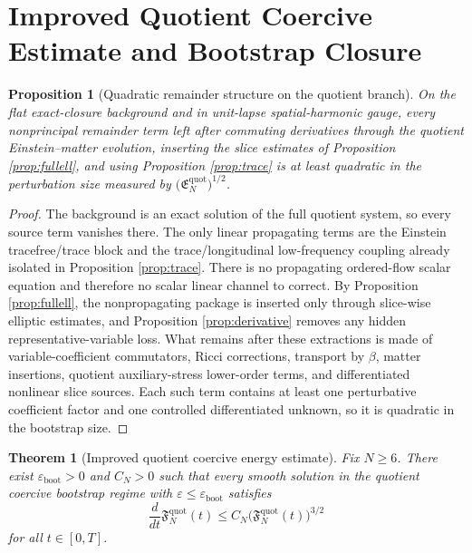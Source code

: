 \documentclass[11pt]{article}
\newtheorem{proposition}{Proposition}
\newtheorem{theorem}{Theorem}
\begin{document}
\section{Improved Quotient Coercive Estimate and Bootstrap Closure}

\begin{proposition}[Quadratic remainder structure on the quotient branch]
\label{prop:quadratic}
On the flat exact-closure background and in unit-lapse spatial-harmonic gauge, every nonprincipal remainder term left after commuting derivatives through the quotient Einstein--matter evolution, inserting the slice estimates of Proposition \ref{prop:fullell}, and using Proposition \ref{prop:trace} is at least quadratic in the perturbation size measured by \(\bigl(\mathfrak E_N^{\mathrm{quot}}\bigr)^{1/2}\).
\end{proposition}

\begin{proof}
The background is an exact solution of the full quotient system, so every source term vanishes there. The only linear propagating terms are the Einstein tracefree/trace block and the trace/longitudinal low-frequency coupling already isolated in Proposition \ref{prop:trace}. There is no propagating ordered-flow scalar equation and therefore no scalar linear channel to correct. By Proposition \ref{prop:fullell}, the nonpropagating package is inserted only through slice-wise elliptic estimates, and Proposition \ref{prop:derivative} removes any hidden representative-variable loss. What remains after these extractions is made of variable-coefficient commutators, Ricci corrections, transport by \(\beta\), matter insertions, quotient auxiliary-stress lower-order terms, and differentiated nonlinear slice sources. Each such term contains at least one perturbative coefficient factor and one controlled differentiated unknown, so it is quadratic in the bootstrap size.
\end{proof}

\begin{theorem}[Improved quotient coercive energy estimate]
\label{thm:ineq}
Fix \(N\ge 6\). There exist \(\varepsilon_{\mathrm{boot}}>0\) and \(C_N>0\) such that every smooth solution in the quotient coercive bootstrap regime with \(\varepsilon\le \varepsilon_{\mathrm{boot}}\) satisfies
\begin{equation}
\frac{d}{dt}\mathfrak F_N^{\mathrm{quot}}(t)
\le
C_N\bigl(\mathfrak F_N^{\mathrm{quot}}(t)\bigr)^{3/2}
\label{eq:quadraticineq}
\end{equation}
for all \(t\in[0,T]\).
\end{theorem}
\end{document}

